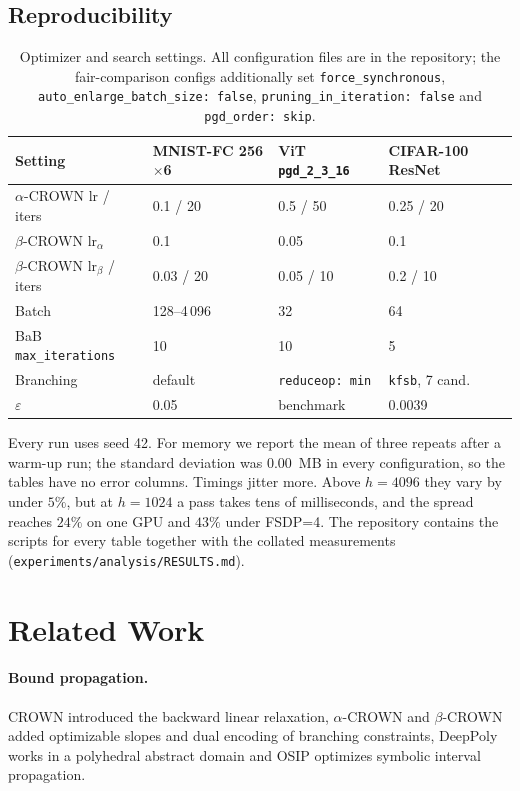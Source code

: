 \documentclass[runningheads]{llncs}
\begin{document}
\subsection{Reproducibility}

\begin{table}[t]
\caption{Optimizer and search settings. All configuration files are in the
repository; the fair-comparison configs additionally set
\texttt{force\_synchronous}, \texttt{auto\_enlarge\_batch\_size: false},
\texttt{pruning\_in\_iteration: false} and \texttt{pgd\_order: skip}.}
\label{tab:hyper}
\small
\centering
\begin{tabular}{llll}
\toprule
Setting & MNIST-FC 256$\times$6 & ViT \texttt{pgd\_2\_3\_16} & CIFAR-100 ResNet \\
\midrule
$\alpha$-CROWN lr / iters      & 0.1 / 20      & 0.5 / 50   & 0.25 / 20 \\
$\beta$-CROWN lr$_\alpha$      & 0.1           & 0.05       & 0.1 \\
$\beta$-CROWN lr$_\beta$ / iters & 0.03 / 20   & 0.05 / 10  & 0.2 / 10 \\
Batch                          & 128--4\,096   & 32         & 64 \\
BaB \texttt{max\_iterations}   & 10            & 10         & 5 \\
Branching                      & default       & \texttt{reduceop: min} & \texttt{kfsb}, 7 cand. \\
$\varepsilon$                  & 0.05          & benchmark  & 0.0039 \\
\bottomrule
\end{tabular}
\end{table}

Every run uses seed 42. For memory we report the mean of three repeats after a
warm-up run; the standard deviation was $0.00$~MB in every configuration, so
the tables have no error columns. Timings jitter more. Above $h{=}4096$ they
vary by under $5\%$, but at $h{=}1024$ a pass takes tens of milliseconds, and
the spread reaches $24\%$ on one GPU and $43\%$ under FSDP=4. The repository
contains the scripts for every table together with the collated measurements
(\texttt{experiments/analysis/RESULTS.md}).

\section{Related Work}
\label{sec:related}

\paragraph{Bound propagation.} CROWN \cite{CROWNPaper} introduced the backward
linear relaxation, $\alpha$-CROWN \cite{Xu2021FastComplete} and
$\beta$-CROWN \cite{betaCROWN2021} added optimizable slopes and dual encoding of
branching constraints, DeepPoly \cite{DeepPolyAbstractDomain} works in a
polyhedral abstract domain and OSIP \cite{arXiv2212OSIP} optimizes symbolic
interval propagation.
\end{document}
